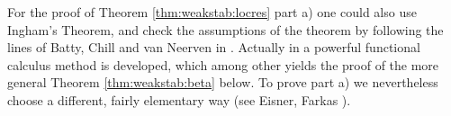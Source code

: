 \documentclass[11pt,intlimits, draft,oneside]{amsart}
\theoremstyle{definition}
\begin{document}
For the proof of Theorem \ref{thm:weakstab:locres} part a) one could
also use Ingham's Theorem, and check the assumptions of the theorem
by following the lines of Batty, Chill and van Neerven in
\cite{batty/chill/vanneerven:2000}. Actually in
\cite{batty/chill/vanneerven:2000}  a powerful functional calculus
 method is developed, which among other yields the proof of the more general Theorem \ref{thm:weakstab:beta} below.
 To prove part a) we nevertheless choose
a different, fairly elementary way
 (see Eisner, Farkas \cite{eisner/farkas:2006}). 
\end{document}
